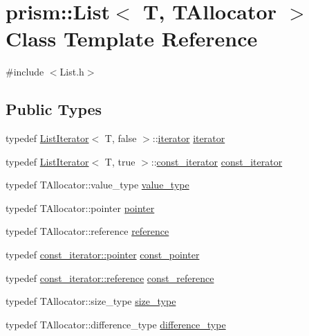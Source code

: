 \hypertarget{classprism_1_1_list}{}\section{prism\+:\+:List$<$ T, T\+Allocator $>$ Class Template Reference}
\label{classprism_1_1_list}


{\ttfamily \#include $<$List.\+h$>$}

\subsection*{Public Types}
\begin{DoxyCompactItemize}
\item 
typedef \hyperlink{structprism_1_1_list_iterator}{List\+Iterator}$<$ T, false $>$\+::\hyperlink{classprism_1_1_list_aa95cb21a8754f91406f53bd0315513af}{iterator} \hyperlink{classprism_1_1_list_aa95cb21a8754f91406f53bd0315513af}{iterator}
\item 
typedef \hyperlink{structprism_1_1_list_iterator}{List\+Iterator}$<$ T, true $>$\+::\hyperlink{classprism_1_1_list_a82987892223347376baec1efd26aa655}{const\+\_\+iterator} \hyperlink{classprism_1_1_list_a82987892223347376baec1efd26aa655}{const\+\_\+iterator}
\item 
typedef T\+Allocator\+::value\+\_\+type \hyperlink{classprism_1_1_list_a3e9cab77c935e6bc2e96bcb00006382e}{value\+\_\+type}
\item 
typedef T\+Allocator\+::pointer \hyperlink{classprism_1_1_list_ac9c2d25c50b4ebfb02687eeb4e9668bc}{pointer}
\item 
typedef T\+Allocator\+::reference \hyperlink{classprism_1_1_list_a87113fe9cf2580e395e3d9f2962f4e81}{reference}
\item 
typedef \hyperlink{structprism_1_1_list_iterator_adb94db3cc26f2df6b6962b756b6fa3c3}{const\+\_\+iterator\+::pointer} \hyperlink{classprism_1_1_list_a7510b11c3c426f8504ddf024be7aaa89}{const\+\_\+pointer}
\item 
typedef \hyperlink{structprism_1_1_list_iterator_a8a07c86e6d1ef38b0f7d390ad7c05c22}{const\+\_\+iterator\+::reference} \hyperlink{classprism_1_1_list_a31c013c3f9135c28c3c4bf489fbeb322}{const\+\_\+reference}
\item 
typedef T\+Allocator\+::size\+\_\+type \hyperlink{classprism_1_1_list_a1dbc0ff68e25381f32639b7ba2ba390d}{size\+\_\+type}
\item 
typedef T\+Allocator\+::difference\+\_\+type \hyperlink{classprism_1_1_list_a02ec6617f6c1782af39c85431c6803ab}{difference\+\_\+type}
\end{DoxyCompactItemize}
